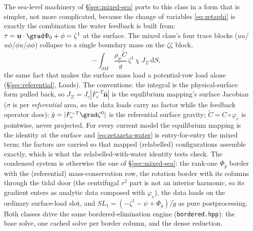 \documentclass[11pt]{article}
\numberwithin{equation}{section}
\theoremstyle{remark}
\newcommand{\dS}{\,\mathrm{d}S}
\newcommand{\vu}{\mathbf{u}}
\newcommand{\vn}{\hat{\mathbf{n}}}
\newcommand{\code}[1]{\texttt{#1}}
\begin{document}
The sea-level machinery of \S\ref{sec:mixed-sea} ports to this class in
a form that is simpler, not more complicated, because the change of
variables \eqref{eq:zetaphi} is exactly the combination the water
feedback is built from: $\tau = \vu\cdot\grad\Phi_0 + \phi = \zeta^1$ at
the surface. The mixed class's four trace blocks
($uu$/$u\phi$/$\phi u$/$\phi\phi$) collapse to a single boundary mass on
the $\zeta\zeta$ block,
\begin{equation}
  -\int_{\partial M} \frac{\rho_w\tilde C}{\tilde g}\,
    \zeta^1\,\chi\; J_\Sigma\dS,
  \label{eq:zetazeta-water}
\end{equation}
the same fact that makes the surface mass load a potential-row load
alone (\S\ref{sec:referential}, Loads). The conventions: the integral
is the physical-surface form pulled back, so $J_\Sigma =
J_e|F_e^{-T}\vn|$ is the equilibrium mapping's surface Jacobian
($\sigma$ is per \emph{referential} area, so the data loads carry no
factor while the feedback operator does); $\tilde g = |F_e^{-T}
\grad\zeta^0|$ is the referential surface gravity; $\tilde C =
C\circ\varphi_e$ is pointwise, never projected. For every current model
the equilibrium mapping is the identity at the surface and
\eqref{eq:zetazeta-water} is entry-for-entry the mixed term; the factors
are carried so that mapped (relabelled) configurations assemble exactly,
which is what the relabelled-with-water identity tests check. The condensed system is otherwise the
one of \S\ref{sec:mixed-sea}: the rank-one $\Phi_g$ border with the
(referential) mass-conservation row, the rotation border with its
columns through the tidal door (the centrifugal $r^2$ part is not an
interior harmonic, so its gradient enters as analytic data composed
with $\varphi_e$), the data loads on the ordinary surface-load slot,
and $SL_1 = (-\zeta^1 - \psi + \Phi_g)/\tilde g$ as pure
postprocessing. Both classes drive the same bordered-elimination
engine (\code{bordered.hpp}): the base solve, one cached solve per
border column, and the dense reduction.
\end{document}
